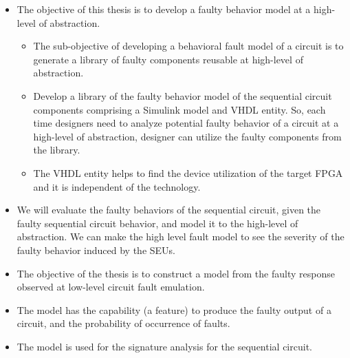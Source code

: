 \begin{itemize}


\item{The objective of this thesis is to develop a faulty behavior model
at a high-level of abstraction.} 

\begin{itemize}
\item The sub-objective of developing a behavioral fault model of a circuit is to generate a library of faulty components reusable at high-level of abstraction.

\item{Develop a library of the faulty behavior model of the sequential circuit
components comprising a Simulink model and VHDL entity. So, each time designers need to analyze potential faulty behavior of a circuit at a high-level of abstraction, designer can utilize the faulty components from the library}.

\item The VHDL entity helps to find the device utilization of the target FPGA and it is independent of the technology.
\end{itemize}


\item We will evaluate the faulty behaviors of the sequential circuit, given the faulty sequential circuit behavior, and model it to the high-level of abstraction. We can make the high level fault model to see the severity of the faulty behavior induced by the SEUs.

\item The objective of the thesis is to construct a model from the faulty response observed at low-level circuit fault emulation.







\item{The model has the capability (a feature) to produce the faulty output of a circuit, and the probability of occurrence of faults.}



\item The model is used for the signature analysis for the sequential circuit.







\end{itemize}

